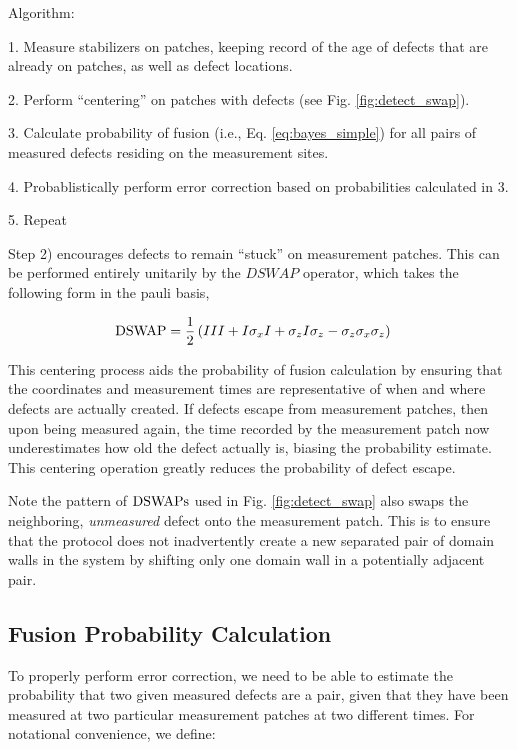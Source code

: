 \documentclass[twocolumn,superscriptaddress,aps,prb,floatfix]{revtex4-1}
\newcommand{\figref}[1]{Fig. \ref{#1}}
\begin{document}
Algorithm:

1. Measure stabilizers on patches, keeping record of the age of defects that are already on patches, as well as defect locations.

2. Perform ``centering'' on patches with defects (see \figref{fig:detect_swap}).

3. Calculate probability of fusion (i.e., Eq. \ref{eq:bayes_simple}) for all pairs of measured defects residing on the measurement sites.

4. Probablistically perform error correction based on probabilities calculated in 3.

5. Repeat

Step 2) encourages defects to remain ``stuck'' on measurement patches.  This can be performed entirely unitarily by the $DSWAP$ operator, which takes the following form in the pauli basis,

\begin{align}
\rm{DSWAP} &= \frac{1}{2} \left(III + I\sigma_x I + \sigma_z I \sigma_z - \sigma_z \sigma_x \sigma_z \right)
\end{align}


This centering process aids the probability of fusion calculation by ensuring that the coordinates and measurement times are representative of when and where defects are actually created.  If defects escape from measurement patches, then upon being measured again, the time recorded by the measurement patch now underestimates how old the defect actually is, biasing the probability estimate.  This centering operation greatly reduces the probability of defect escape.

 Note the pattern of $\rm{DSWAP}s$ used in \figref{fig:detect_swap} also swaps the neighboring, \emph{unmeasured} defect onto the measurement patch.  This is to ensure that the protocol does not inadvertently create a new separated pair of domain walls in the system by shifting only one domain wall in a potentially adjacent pair. 
 
\subsection{Fusion Probability Calculation}

To properly perform error correction, we need to be able to estimate the probability that two given measured defects are a pair, given that they have been measured at two particular measurement patches at two different times.  For notational convenience, we define:
\end{document}
